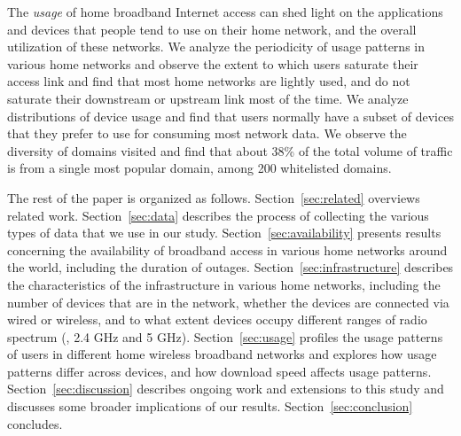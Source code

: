 The {\em usage} of home broadband Internet access can shed light on the
applications and devices that people tend to use on their home network, and the
overall utilization of these networks. We analyze 
the periodicity of usage patterns in various home networks and observe the extent
to which users saturate their access link and find that most home networks are
lightly used, and do not saturate their downstream or upstream link most of the
time.  We analyze distributions of device usage and find that users normally
have a subset of devices that they prefer to use for consuming most network
data. %
We observe the diversity of domains visited and find that about 38\% of the
total volume of traffic is from a single most popular domain, among 200
whitelisted domains.

The rest of the paper is organized as follows.
Section~\ref{sec:related} overviews related work.
Section~\ref{sec:data} describes the process of collecting the various
types of data that we use in our study.  Section~\ref{sec:availability}
presents results concerning the availability of broadband access in
various home networks around the world, including the duration of
outages.  Section~\ref{sec:infrastructure} describes the characteristics
of the infrastructure in various home networks, including the number of
devices that are in the network, whether the devices are connected
via wired or wireless, and to what extent devices occupy different
ranges of radio spectrum (\eg, 2.4 GHz and 5 GHz).
Section~\ref{sec:usage} profiles the usage patterns of users in
different home wireless broadband networks and explores how usage
patterns differ across devices, and how download speed affects usage
patterns.  Section~\ref{sec:discussion} describes ongoing work and
extensions to this study and discusses some broader implications of our
results.  Section~\ref{sec:conclusion} concludes.
